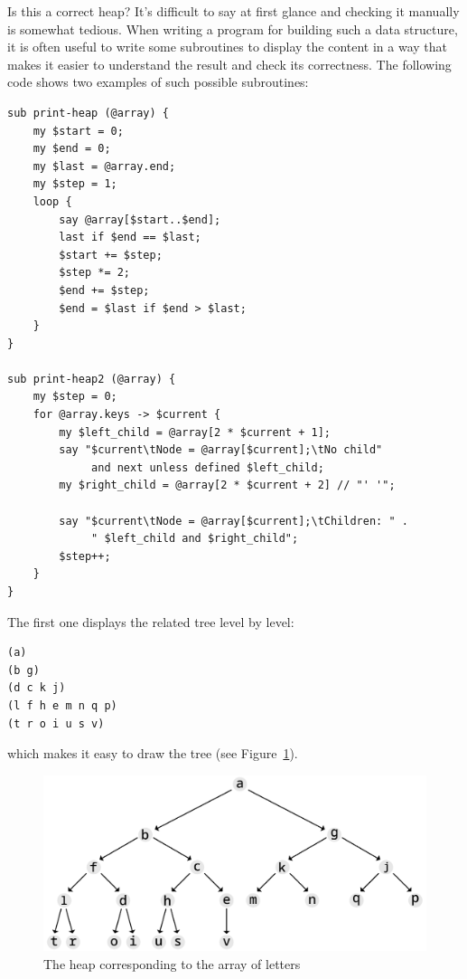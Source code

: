 Is this a correct heap? It's difficult to say at first 
glance and checking it manually is somewhat tedious. When 
writing a program for building such a data structure, 
it is often useful to write some subroutines to display 
the content in a way that makes it easier to understand 
the result and check its correctness. The following 
code shows two examples of such possible subroutines:
\begin{verbatim}
sub print-heap (@array) {
    my $start = 0;
    my $end = 0;
    my $last = @array.end;
    my $step = 1;
    loop {
        say @array[$start..$end];
        last if $end == $last;
        $start += $step;
        $step *= 2;
        $end += $step;
        $end = $last if $end > $last;
    } 
}

sub print-heap2 (@array) {
    my $step = 0;
    for @array.keys -> $current {
        my $left_child = @array[2 * $current + 1];
        say "$current\tNode = @array[$current];\tNo child" 
             and next unless defined $left_child;
        my $right_child = @array[2 * $current + 2] // "' '";
        
        say "$current\tNode = @array[$current];\tChildren: " . 
             " $left_child and $right_child";
        $step++;
    }
}

\end{verbatim}

The first one displays the related tree level by level:

\begin{verbatim}
(a)
(b g)
(d c k j)
(l f h e m n q p)
(t r o i u s v)
\end{verbatim}

which makes it easy to draw the tree (see Figure~\ref{fig.heap2}).

\begin{figure}
\centerline
{\includegraphics[scale=0.8]{figs/figure_heap2.pdf}}
\caption{The heap corresponding to the array of letters}
\label{fig.heap2}
\end{figure}


